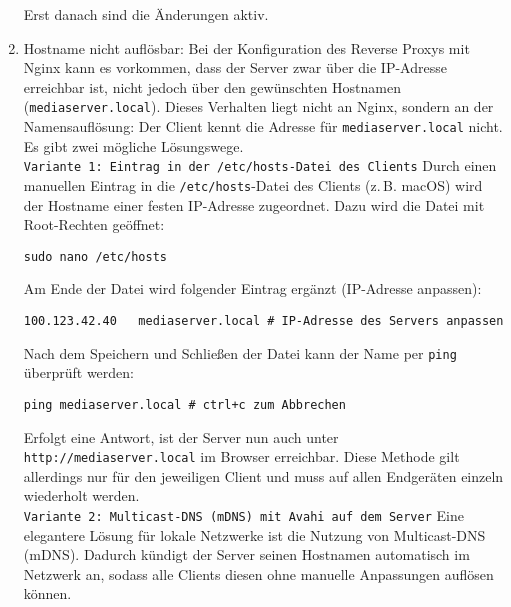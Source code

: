 \documentclass[12pt,a4paper]{report}
\begin{document}
\begin{enumerate}
      Erst danach sind die Änderungen aktiv.

      \item Hostname nicht auflösbar:
      Bei der Konfiguration des Reverse Proxys mit Nginx kann es vorkommen, dass der Server zwar über die IP-Adresse erreichbar ist, 
      nicht jedoch über den gewünschten Hostnamen (\texttt{mediaserver.local}).  
      Dieses Verhalten liegt nicht an Nginx, sondern an der Namensauflösung: Der Client kennt die Adresse für \texttt{mediaserver.local} nicht.  
      Es gibt zwei mögliche Lösungswege.
      \\
      \newline
      \texttt{Variante 1: Eintrag in der \texttt{/etc/hosts}-Datei des Clients}
      Durch einen manuellen Eintrag in die \texttt{/etc/hosts}-Datei des Clients (z.\,B. macOS) wird der Hostname einer festen IP-Adresse zugeordnet.  
      Dazu wird die Datei mit Root-Rechten geöffnet:

      \begin{verbatim}
sudo nano /etc/hosts
      \end{verbatim}

      Am Ende der Datei wird folgender Eintrag ergänzt (IP-Adresse anpassen):

      \begin{verbatim}
100.123.42.40   mediaserver.local # IP-Adresse des Servers anpassen
      \end{verbatim}

      Nach dem Speichern und Schließen der Datei kann der Name per \texttt{ping} überprüft werden:

      \begin{verbatim}
ping mediaserver.local # ctrl+c zum Abbrechen
      \end{verbatim}

      Erfolgt eine Antwort, ist der Server nun auch unter \texttt{http://mediaserver.local} im Browser erreichbar.  
      Diese Methode gilt allerdings nur für den jeweiligen Client und muss auf allen Endgeräten einzeln wiederholt werden.
      \\
      \newline
      \texttt{Variante 2: Multicast-DNS (mDNS) mit Avahi auf dem Server}
      Eine elegantere Lösung für lokale Netzwerke ist die Nutzung von Multicast-DNS (mDNS).  
      Dadurch kündigt der Server seinen Hostnamen automatisch im Netzwerk an, sodass alle Clients diesen ohne manuelle Anpassungen auflösen können.


\end{enumerate}
\end{document}
